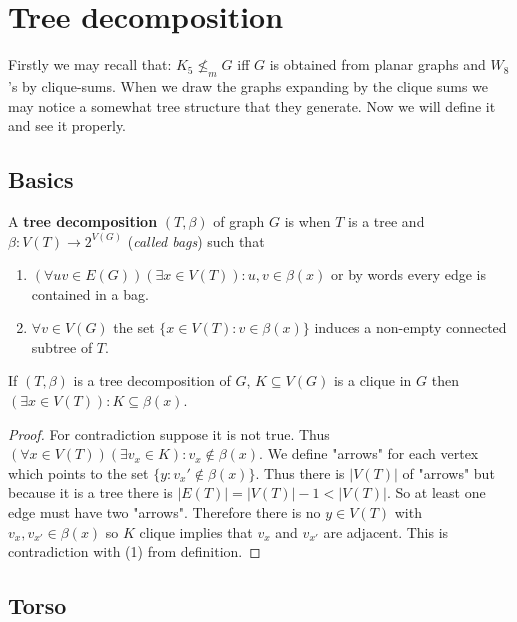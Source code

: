 \chapter{Tree decomposition}

Firstly we may recall that: $K_{5} \nleq_{m} G$ iff $G$ is obtained from planar graphs and $W_{8}$'s by clique-sums. When we draw the graphs expanding by the clique sums we may notice a somewhat tree structure that they generate. Now we will define it and see it properly.

\section{Basics}

\begin{defn}
	A \textbf{tree decomposition} $(T, \beta)$ of graph $G$ is when $T$ is a tree and $\beta: V(T) \to 2^{V(G)}$ (\textit{called bags}) such that
	
	\begin{enumerate}[(1)]
		\item $(\forall uv \in E(G)) (\exists x \in V(T)): u,v \in \beta(x)$ or by words every edge is contained in a bag.
		\item $\forall v \in V(G)$ the set $\{x \in V(T) : v \in \beta(x)\}$ induces a non-empty connected subtree of $T$.
	\end{enumerate}
\end{defn}

\begin{lemma}
	If $(T, \beta)$ is a tree decomposition of $G$, $K \subseteq V(G)$ is a clique in $G$ then $(\exists x \in V(T)) : K \subseteq \beta(x)$.
\end{lemma}

\begin{proof}
	For contradiction suppose it is not true. Thus $(\forall x \in V(T)) (\exists v_{x} \in K) : v_{x} \notin \beta(x)$. We define "arrows" for each vertex which points to the set $\{y : v_{x}' \notin \beta(x)\}$. Thus there is $|V(T)|$ of "arrows" but because it is a tree there is $|E(T)| = |V(T)| - 1 < |V(T)|$. So at least one edge must have two "arrows". Therefore there is no $y \in V(T)$ with $v_{x}, v_{x'} \in \beta(x)$ so $K$ clique implies that $v_{x}$ and $v_{x'}$ are adjacent. This is contradiction with (1) from definition.
\end{proof}

\section{Torso}

